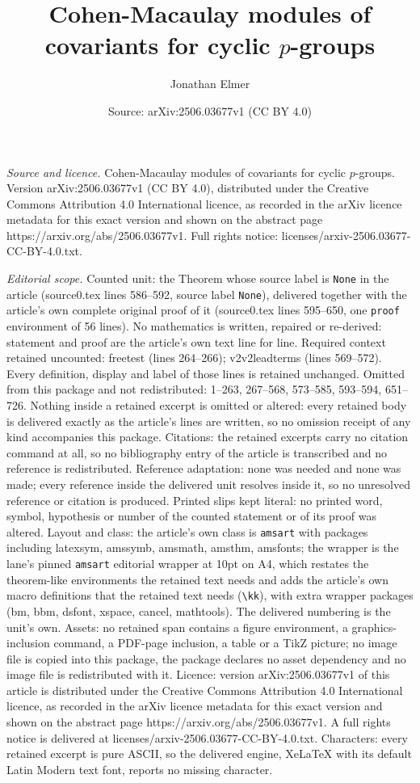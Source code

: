 \documentclass[10pt,a4paper]{amsart}
\title[Cohen-Macaulay modules of covariants for cyclic $p$-groups]{Cohen-Macaulay modules of covariants for cyclic $p$-groups}
\author{Jonathan Elmer}
\date{Source: arXiv:2506.03677v1 (CC BY 4.0)}
\begin{document}
\maketitle

\noindent\emph{Source and licence.} Cohen-Macaulay modules of covariants for cyclic $p$-groups. Version arXiv:2506.03677v1 (CC BY 4.0), distributed under the Creative Commons Attribution 4.0 International licence, as recorded in the arXiv licence metadata for this exact version and shown on the abstract page https://arxiv.org/abs/2506.03677v1. Full rights notice: licenses/arxiv-2506.03677-CC-BY-4.0.txt.\par\smallskip

\noindent\textit{Editorial scope.} Counted unit: the Theorem whose source label is \texttt{None} in the article (source0.tex lines 586--592, source label \texttt{None}), delivered together with the article's own complete original proof of it (source0.tex lines 595--650, one \texttt{proof} environment of 56 lines). No mathematics is written, repaired or re-derived: statement and proof are the article's own text line for line. Required context retained uncounted: freetest (lines 264--266); v2v2leadterms (lines 569--572). Every definition, display and label of those lines is retained unchanged. Omitted from this package and not redistributed: 1--263, 267--568, 573--585, 593--594, 651--726. Nothing inside a retained excerpt is omitted or altered: every retained body is delivered exactly as the article's lines are written, so no omission receipt of any kind accompanies this package. Citations: the retained excerpts carry no citation command at all, so no bibliography entry of the article is transcribed and no reference is redistributed. Reference adaptation: none was needed and none was made; every reference inside the delivered unit resolves inside it, so no unresolved reference or citation is produced. Printed slips kept literal: no printed word, symbol, hypothesis or number of the counted statement or of its proof was altered. Layout and class: the article's own class is \texttt{amsart} with packages including latexsym, amssymb, amsmath, amsthm, amsfonts; the wrapper is the lane's pinned \texttt{amsart} editorial wrapper at 10pt on A4, which restates the theorem-like environments the retained text needs and adds the article's own macro definitions that the retained text needs (\texttt{\textbackslash kk}), with extra wrapper packages (bm, bbm, dsfont, xspace, cancel, mathtools). The delivered numbering is the unit's own. Assets: no retained span contains a figure environment, a graphics-inclusion command, a PDF-page inclusion, a table or a TikZ picture; no image file is copied into this package, the package declares no asset dependency and no image file is redistributed with it. Licence: version arXiv:2506.03677v1 of this article is distributed under the Creative Commons Attribution 4.0 International licence, as recorded in the arXiv licence metadata for this exact version and shown on the abstract page https://arxiv.org/abs/2506.03677v1. A full rights notice is delivered at licenses/arxiv-2506.03677-CC-BY-4.0.txt. Characters: every retained excerpt is pure ASCII, so the delivered engine, XeLaTeX with its default Latin Modern text font, reports no missing character.
\end{document}
